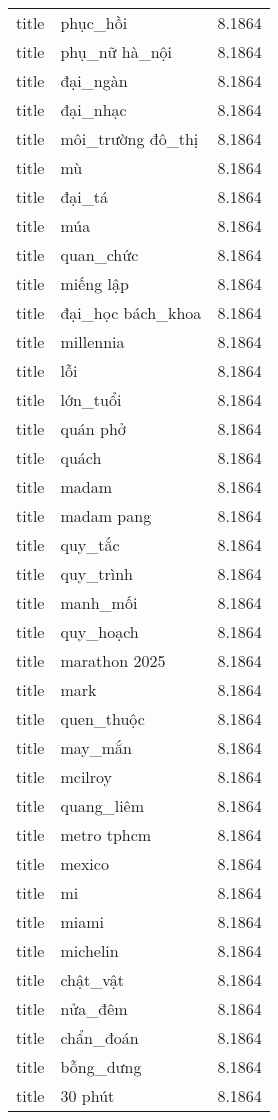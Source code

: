 \documentclass{article}
\begin{document}
\begin{tabular}{lll}
title & phục\_hồi & 8.1864\\
title & phụ\_nữ hà\_nội & 8.1864\\
title & đại\_ngàn & 8.1864\\
title & đại\_nhạc & 8.1864\\
title & môi\_trường đô\_thị & 8.1864\\
title & mù & 8.1864\\
title & đại\_tá & 8.1864\\
title & múa & 8.1864\\
title & quan\_chức & 8.1864\\
title & miếng lập & 8.1864\\
title & đại\_học bách\_khoa & 8.1864\\
title & millennia & 8.1864\\
title & lỗi & 8.1864\\
title & lớn\_tuổi & 8.1864\\
title & quán phở & 8.1864\\
title & quách & 8.1864\\
title & madam & 8.1864\\
title & madam pang & 8.1864\\
title & quy\_tắc & 8.1864\\
title & quy\_trình & 8.1864\\
title & manh\_mối & 8.1864\\
title & quy\_hoạch & 8.1864\\
title & marathon 2025 & 8.1864\\
title & mark & 8.1864\\
title & quen\_thuộc & 8.1864\\
title & may\_mắn & 8.1864\\
title & mcilroy & 8.1864\\
title & quang\_liêm & 8.1864\\
title & metro tphcm & 8.1864\\
title & mexico & 8.1864\\
title & mi & 8.1864\\
title & miami & 8.1864\\
title & michelin & 8.1864\\
title & chật\_vật & 8.1864\\
title & nửa\_đêm & 8.1864\\
title & chẩn\_đoán & 8.1864\\
title & bỗng\_dưng & 8.1864\\
title & 30 phút & 8.1864\\

\end{tabular}
\end{document}
